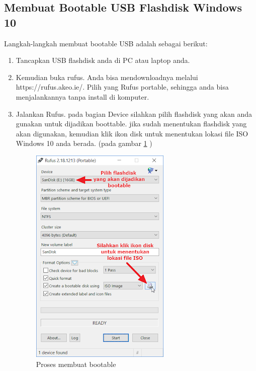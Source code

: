\subsection{Membuat Bootable USB Flashdisk Windows 10}
Langkah-langkah membuat bootable USB adalah sebagai berikut:
\begin{enumerate}
  \item Tancapkan USB flashdisk anda di PC atau laptop anda. 
  \item Kemudian buka rufus. Anda bisa mendownloadnya melalui https://rufus.akeo.ie/. Pilih yang Rufus portable, sehingga anda bisa menjalankannya tanpa install di komputer. 
  \item Jalankan Rufus. pada bagian Device silahkan pilih flashdisk yang akan anda gunakan untuk dijadikan boottable. jika sudah menentukan flashdisk yang akan digunakan, kemudian klik ikon disk untuk menentukan lokasi file ISO Windows 10 anda berada. (pada gambar \ref{labelgambar1} )
      \begin{figure}[h!]
	\centering
	\includegraphics[scale=0.4]{figures/1.png}
	\caption{Proses membuat bootable}
	\label{labelgambar1}
	\end{figure}


\end{enumerate}
